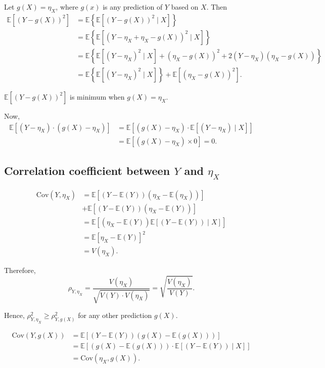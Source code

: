 Let $g(X) = \eta_X$, where $g(x)$ is any prediction of $Y$ based on $X$. Then
\begin{align*}
    \mathbb{E}[(Y - g(X))^2] &= \mathbb{E}\left\{ \mathbb{E}[(Y - g(X))^2 \mid X] \right\}\\
    &= \mathbb{E}\left\{ \mathbb{E}[(Y - \eta_X + \eta_X - g(X))^2 \mid X] \right\}\\
    &= \mathbb{E}\left\{ \mathbb{E}[(Y - \eta_X)^2 \mid X] + (\eta_X - g(X))^2 + 2(Y - \eta_X)(\eta_X - g(X)) \right\}\\
    &= \mathbb{E}\left\{ \mathbb{E}[(Y - \eta_X)^2 \mid X] \right\} + \mathbb{E}[(\eta_X - g(X))^2].
\end{align*}

$\mathbb{E}[(Y - g(X))^2]$ is minimum when $g(X) = \eta_X$.

Now,
\begin{align*}
    \mathbb{E}[(Y - \eta_X) \cdot (g(X) - \eta_X)] &= \mathbb{E}[(g(X) - \eta_X) \cdot \mathbb{E}[(Y - \eta_X) \mid X]]\\
    &= \mathbb{E}[(g(X) - \eta_X) \times 0] = 0.
\end{align*}

\subsection{Correlation coefficient between $Y$ and $\eta_X$}

\begin{align*}
    \text{Cov}(Y, \eta_X) &= \mathbb{E}[(Y - \mathbb{E}(Y))(\eta_X - \mathbb{E}(\eta_X))]\\
    &+ \mathbb{E}[(Y - \mathbb{E}(Y))(\eta_X - \mathbb{E}(Y))]\\
    &= \mathbb{E}\left[ (\eta_X - \mathbb{E}(Y)) \mathbb{E}[(Y - \mathbb{E}(Y)) \mid X] \right]\\
    &= \mathbb{E}[\eta_X - \mathbb{E}(Y)]^2\\
    &= V(\eta_X).
\end{align*}

Therefore,
\[
    \rho_{Y, \eta_X} = \frac{V(\eta_X)}{\sqrt{V(Y) \cdot V(\eta_X)}} = \sqrt{\frac{V(\eta_X)}{V(Y)}}.
\]

Hence, $\rho_{Y, \eta_X}^2 \geq \rho_{Y, g(X)}^2$ for any other prediction $g(X)$.

\begin{align*}
    \text{Cov}(Y, g(X)) &= \mathbb{E}[(Y - \mathbb{E}(Y))(g(X) - \mathbb{E}(g(X)))]\\
    &= \mathbb{E}\left[ (g(X) - \mathbb{E}(g(X))) \cdot \mathbb{E}[(Y - \mathbb{E}(Y)) \mid X] \right]\\
    &= \text{Cov}(\eta_X, g(X)).
\end{align*}

